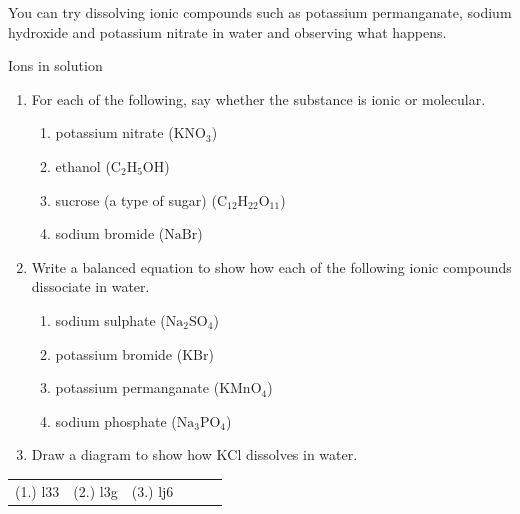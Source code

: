    \noindent
You can try dissolving ionic compounds such as potassium permanganate, sodium hydroxide and potassium nitrate in water and observing what happens. 
  \label{m38720*secfhsst!!!underscore!!!id338}
\begin{exercises}{Ions in solution}
\label{m38720*id336094}\begin{enumerate}[noitemsep, label=\textbf{\arabic*}. ]
\vspace{-1cm}
\label{m38720*uid22}\item For each of the following, say whether the substance is ionic or molecular.
\label{m38720*id336110}\begin{enumerate}[noitemsep, label=\textbf{\alph*}. ] 
\label{m38720*uid23}\item potassium nitrate ($\text{KNO}_{3}$)
\label{m38720*uid24}\item ethanol ($\text{C}_{2}\text{H}_{5}\text{OH}$)
\label{m38720*uid25}\item sucrose (a type of sugar) ($\text{C}_{12}\text{H}_{22}\text{O}_{11}$)
\label{m38720*uid26}\item sodium bromide ($\text{NaBr}$)
\end{enumerate}
\label{m38720*uid27}\item Write a balanced equation to show how each of the following ionic compounds dissociate in water.
\label{m38720*id336252}\begin{enumerate}[noitemsep, label=\textbf{\alph*}. ] 
            \label{m38720*uid28}\item sodium sulphate ($\text{Na}_{2}\text{SO}_{4}$)
\label{m38720*uid29}\item potassium bromide ($\text{KBr}$)
\label{m38720*uid30}\item potassium permanganate ($\text{KMnO}_{4}$)
\label{m38720*uid31}\item sodium phosphate ($\text{Na}_{3}\text{PO}_{4}$)
\end{enumerate}
\item Draw a diagram to show how $\text{KCl}$ dissolves in water.
\end{enumerate}
\practiceinfo
\par 
 \par \begin{tabular}[h]{cccccc}
 (1.) l33  &  (2.) l3g  & (3.) lj6 \end{tabular}
\end{exercises}
